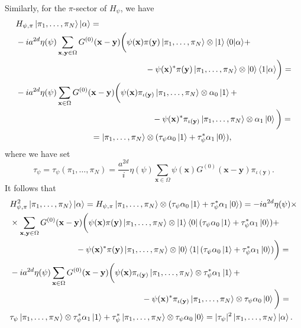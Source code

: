 \documentclass[a4paper,10pt]{report}
\begin{document}
Similarly, for the $\pi$-sector of $H_\psi$, we have
\begin{align}
&H_{\psi,\pi}\ket{\pi_1,\dots,\pi_N}\ket{\alpha} = \nonumber\\
&-ia^{2d}\eta(\psi)\sum_{\mathbf{x},\mathbf{y}\in\Omega}G^{(0)}(\mathbf{x}-\mathbf{y})\bigg(\psi(\mathbf{x})\pi(\mathbf{y})\ket{\pi_1,\dots,\pi_N}\otimes\ket{1}\langle 0|\alpha\rangle + \nonumber\\
&\hspace{5.5cm}- \psi(\mathbf{x})^*\pi(\mathbf{y})\ket{\pi_1,\dots,\pi_N}\otimes\ket{0}\langle 1|\alpha\rangle\bigg) = \nonumber\\
&-ia^{2d}\eta(\psi)\sum_{\mathbf{x}\in\Omega}G^{(0)}(\mathbf{x}-\mathbf{y})\bigg(\psi(\mathbf{x})\pi_{\iota(\mathbf{y})}\ket{\pi_1,\dots,\pi_N}\otimes\alpha_0\ket{1} + \nonumber\\
&\hspace{5.8cm}- \psi(\mathbf{x})^*\pi_{\iota(\mathbf{y})}\ket{\pi_1,\dots,\pi_N}\otimes\alpha_1\ket{0}\bigg) = \nonumber\\
&\hspace{3.2cm}=\ket{\pi_1,\dots,\pi_N}\otimes(\tau_\psi\alpha_0\ket{1} + \tau_\psi^*\alpha_1\ket{0}),
\label{eq:wave_prep_pi}
\end{align}
where we have set
\begin{equation}
\tau_\psi = \tau_\psi(\pi_1,\dots,\pi_N) = \frac{a^{2d}}{i}\eta(\psi)\sum_{\mathbf{x}\in\Omega}\psi(\mathbf{x})G^{(0)}(\mathbf{x}-\mathbf{y})\pi_{\iota(\mathbf{y})}.
\end{equation}
It follows that
\begin{align}
&H^2_{\psi,\pi}\ket{\pi_1,\dots,\pi_N}\ket{\alpha} = H_{\psi,\pi}\ket{\pi_1,\dots,\pi_N}\otimes(\tau_\psi\alpha_0\ket{1} + \tau_\psi^*\alpha_1\ket{0}) = -ia^{2d}\eta(\psi)\times\nonumber\\
&\times\sum_{\mathbf{x},\mathbf{y}\in\Omega}G^{(0)}(\mathbf{x}-\mathbf{y})\bigg(\psi(\mathbf{x})\pi(\mathbf{y})\ket{\pi_1,\dots,\pi_N}\otimes\ket{1}\bra{0}(\tau_\psi\alpha_0\ket{1} + \tau_\psi^*\alpha_1\ket{0}) + \nonumber\\
&\hspace{2.8cm}- \psi(\mathbf{x})^*\pi(\mathbf{y})\ket{\pi_1,\dots,\pi_N}\otimes\ket{0}\bra{1}(\tau_\psi\alpha_0\ket{1} + \tau_\psi^*\alpha_1\ket{0})\bigg) = \nonumber\\
&-ia^{2d}\eta(\psi)\sum_{\mathbf{x}\in\Omega}G^{(0)}(\mathbf{x}-\mathbf{y})\bigg(\psi(\mathbf{x})\pi_{\iota(\mathbf{y})}\ket{\pi_1,\dots,\pi_N}\otimes\tau_\psi^*\alpha_1\ket{1} + \nonumber\\
&\hspace{5.6cm}- \psi(\mathbf{x})^*\pi_{\iota(\mathbf{y})}\ket{\pi_1,\dots,\pi_N}\otimes\tau_\psi\alpha_0\ket{0}\bigg) = \nonumber\\
&\tau_\psi\ket{\pi_1,\dots,\pi_N}\otimes\tau_\psi^*\alpha_1\ket{1} + \tau_\psi^*\ket{\pi_1,\dots,\pi_N}\otimes\tau_\psi\alpha_0\ket{0} = |\tau_\psi|^2\ket{\pi_1,\dots,\pi_N}\ket{\alpha}.
\label{eq:wave_prep_pi_sqrd}
\end{align}
\end{document}
